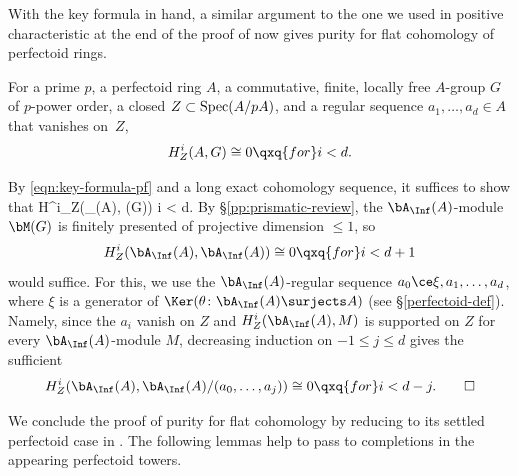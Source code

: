 With the key formula in hand, a similar argument to the one we used in positive characteristic at the end of the proof of  now gives purity for flat cohomology of perfectoid rings.


\bthm\label{thm:perfectoid-purity}
For a prime $p$, a perfectoid ring $A$, a commutative, finite, locally free $A$-group $G$ of $p$-power order, a closed $Z \subset \operatorname{Spec}(A/pA)$, and a regular sequence $a_1, \dotsc, a_d \in A$ that vanishes on~$Z$,
\[
H^i_Z(A, G) \cong 0 \qxq{for} i < d.
\]
\ethm

\bpf
By \eqref{eqn:key-formula-pf} and a long exact cohomology sequence, it suffices to show that
\be \label{eqn:pp-coho-van}
H^i_Z(\bA_\Inf(A), \bM(G))   i < d.
\ee
By \S\ref{pp:prismatic-review}, the $\bA_\Inf(A)$-module $\bM(G)$ is finitely presented of projective dimension $\le 1$, so
\[
H^i_Z(\bA_\Inf(A), \bA_\Inf(A)) \cong 0 \qxq{for} i < d + 1
\]
would suffice. For this, we use the $\bA_\Inf(A)$-regular sequence $a_0 \ce \xi, a_1, \dotsc, a_d$, where $\xi$ is a generator of $\Ker(\theta\colon \bA_\Inf(A) \surjects A)$ (see \S\ref{perfectoid-def}). Namely, since the $a_i$ vanish on $Z$ and $H^i_Z(\bA_\Inf(A), M)$ is supported on $Z$ for every $\bA_\Inf(A)$-module $M$, decreasing induction on $-1 \le j \le d$ gives the sufficient
\[
H^i_Z(\bA_\Inf(A), \bA_\Inf(A)/(a_0, \dotsc, a_j)) \cong 0 \qxq{for} i < d - j. \qedhere
\]
\epf

















\label{grand-finale}



We conclude the proof of purity for flat cohomology by reducing to its settled perfectoid case in .
The following lemmas help to pass to %
completions in the appearing perfectoid towers.



